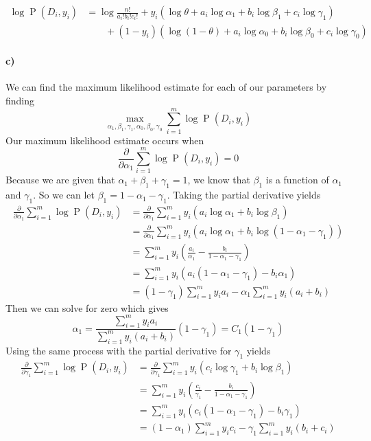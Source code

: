 \documentclass[12pt]{article}
\begin{document}
\begin{align*}
        \log \operatorname{P}(D_i, y_i) &= \log \frac{n!}{a_i!b_i!c_i!} + y_i(\log \theta +a_i\log\alpha_1+b_i\log\beta_1+c_i\log\gamma_1)\\
        &\qquad+(1-y_i)(\log(1-\theta)+a_i\log\alpha_0+b_i\log\beta_0+c_i\log\gamma_0)
\end{align*}

\paragraph{c)}

We can find the maximum likelihood estimate for each of our parameters by finding
\[\max_{\alpha_1,\beta_1,\gamma_1,\alpha_0,\beta_0,\gamma_0}\sum_{i=1}^m\log \operatorname{P}(D_i, y_i)\]
Our maximum likelihood estimate occurs when
\[\frac{\partial}{\partial \alpha_1}\sum_{i=1}^m\log \operatorname{P}(D_i, y_i)=0\]
Because we are given that \(\alpha_1+\beta_1+\gamma_1=1\), we know that \(\beta_1\) is a function of \(\alpha_1\) and \(\gamma_1\). So we can let
\(\beta_1=1-\alpha_1-\gamma_1\). Taking the partial derivative yields
\begin{align*}
        \frac{\partial}{\partial \alpha_1}\sum_{i=1}^m\log \operatorname{P}(D_i, y_i)&=\frac{\partial}{\partial \alpha_1}\sum_{i=1}^m y_i(a_i\log\alpha_1+b_i\log\beta_1)\\
        &=\frac{\partial}{\partial \alpha_1}\sum_{i=1}^m y_i(a_i\log\alpha_1+b_i\log(1-\alpha_1-\gamma_1))\\
        &=\sum_{i=1}^my_i\left(\frac{a_i}{\alpha_1}-\frac{b_i}{1-\alpha_1-\gamma_1}\right)\\
        &=\sum_{i=1}^my_i(a_i(1-\alpha_1-\gamma_1)-b_i\alpha_1)\\
        &=(1-\gamma_1)\sum_{i=1}^m y_ia_i-\alpha_1\sum_{i=1}^m y_i(a_i+b_i)
\end{align*}
Then we can solve for zero which gives
\[\alpha_1=\frac{\sum_{i=1}^m y_ia_i}{\sum_{i=1}^m y_i(a_i+b_i)}(1-\gamma_1)=C_1(1-\gamma_1)\]
Using the same process with the partial derivative for \(\gamma_1\) yields
\begin{align*}
        \frac{\partial}{\partial \gamma_1}\sum_{i=1}^m\log \operatorname{P}(D_i, y_i)&=\frac{\partial}{\partial \gamma_1}\sum_{i=1}^m y_i(c_i\log\gamma_1+b_i\log\beta_1)\\
        &=\sum_{i=1}^my_i\left(\frac{c_i}{\gamma_1}-\frac{b_i}{1-\alpha_1-\gamma_1}\right)\\
        &=\sum_{i=1}^my_i(c_i(1-\alpha_1-\gamma_1)-b_i\gamma_1)\\
        &=(1-\alpha_1)\sum_{i=1}^m y_ic_i-\gamma_1\sum_{i=1}^m y_i(b_i+c_i)
\end{align*}
\end{document}
